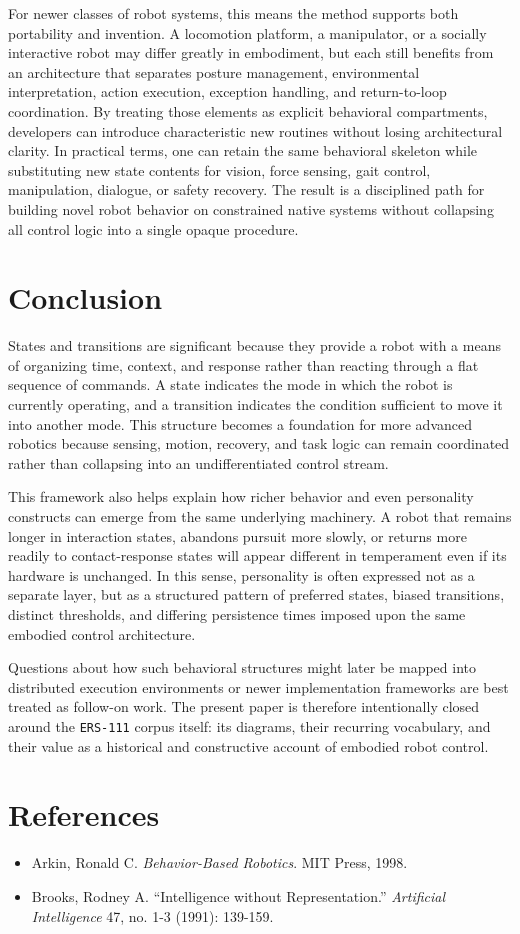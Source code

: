 \documentclass[11pt]{article}
\begin{document}
For newer classes of robot systems, this means the method supports both
portability and invention. A locomotion platform, a manipulator, or a
socially interactive robot may differ greatly in embodiment, but each
still benefits from an architecture that separates posture management,
environmental interpretation, action execution, exception handling, and
return-to-loop coordination. By treating those elements as explicit
behavioral compartments, developers can introduce characteristic new
routines without losing architectural clarity. In practical terms, one
can retain the same behavioral skeleton while substituting new state
contents for vision, force sensing, gait control, manipulation,
dialogue, or safety recovery. The result is a disciplined path for
building novel robot behavior on constrained native systems without
collapsing all control logic into a single opaque procedure.

\section*{Conclusion}

States and transitions are significant because they provide a robot
with a means of organizing time, context, and response rather than
reacting through a flat sequence of commands. A state indicates the
mode in which the robot is currently operating, and a transition
indicates the condition sufficient to move it into another mode. This
structure becomes a foundation for more advanced robotics because
sensing, motion, recovery, and task logic can remain coordinated rather
than collapsing into an undifferentiated control stream.

This framework also helps explain how richer behavior and even
personality constructs can emerge from the same underlying machinery. A
robot that remains longer in interaction states, abandons pursuit more
slowly, or returns more readily to contact-response states will appear
different in temperament even if its hardware is unchanged. In this
sense, personality is often expressed not as a separate layer, but as a
structured pattern of preferred states, biased transitions, distinct
thresholds, and differing persistence times imposed upon the same
embodied control architecture.

Questions about how such behavioral structures might later be mapped
into distributed execution environments or newer implementation
frameworks are best treated as follow-on work. The present paper is
therefore intentionally closed around the \texttt{ERS-111} corpus
itself: its diagrams, their recurring vocabulary, and their value as a
historical and constructive account of embodied robot control.

\section*{References}

\begin{itemize}
\item Arkin, Ronald C. \textit{Behavior-Based Robotics}. MIT Press, 1998.
\item Brooks, Rodney A. ``Intelligence without Representation.'' \textit{Artificial Intelligence} 47, no. 1-3 (1991): 139-159.
\end{itemize}
\end{document}
